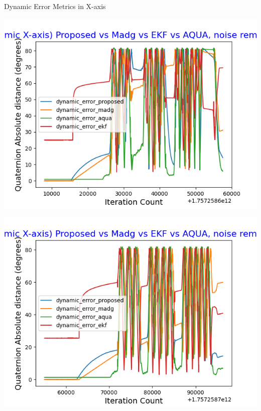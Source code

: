 \documentclass[aspectratio=169,xcolor=dvipsnames]{beamer}
\begin{document}
\begin{frame}{Dynamic Error Metrics in X-axis}
\begin{minipage}{0.5\textwidth}
  \centering
  \includegraphics[width=\linewidth,height=0.35\textheight]{graphs/dynamic_ml_x.png}
\end{minipage}%
\hfill
\begin{minipage}{0.5\textwidth}
  \centering
  \includegraphics[width=\linewidth,height=0.35\textheight]{graphs/dynamic_no_ml_x.png}
\end{minipage}

\end{frame}
\end{document}
